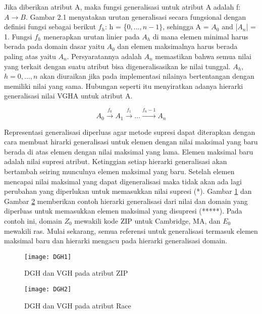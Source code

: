 \newpage
Jika diberikan atribut A, maka fungsi generalisasi untuk atribut A adalah f: $A \rightarrow B$. Gambar 2.1 menyatakan urutan generalisasi secara fungsional dengan definisi fungsi sebagai berikut $f_h$: h = \{$0,\ldots, n-1\}$, sehingga A = $A_0$ and |$A_n$| = 1. Fungsi $f_h$ menerapkan urutan linier pada $A_h$ di mana elemen minimal harus berada pada domain dasar yaitu $A_0$ dan elemen maksimalnya harus berada paling atas yaitu $A_n$. Persyaratannya adalah $A_n$ memastikan bahwa semua nilai yang terkait dengan suatu atribut bisa digeneralisasikan ke nilai tunggal. $A_h$, $h = 0, \ldots, n$ akan diuraikan jika pada implementasi nilainya bertentangan dengan memiliki nilai yang sama. Hubungan seperti itu menyiratkan adanya hierarki generalisasi nilai VGHA untuk atribut A. 

\[
  A_0 \overset{f_0} {\longrightarrow} A_1 \overset{f_1} {\longrightarrow} \mathcal{\ldots} \overset{f_n-1}{\longrightarrow} A_n
\]

Representasi generalisasi diperluas agar metode supresi dapat diterapkan dengan cara membuat hirarki generalisasi untuk elemen dengan nilai maksimal yang baru berada di atas elemen dengan nilai maksimal yang lama. Elemen maksimal baru adalah nilai supresi atribut. Ketinggian setiap hierarki generalisasi akan bertambah seiring munculnya elemen maksimal yang baru. Setelah elemen mencapai nilai maksimal yang dapat digeneralisasi maka tidak akan ada lagi perubahan yang diperlukan untuk memasukkan nilai supresi (*). Gambar \ref{fig:DGH1} dan Gambar \ref{fig:DGH2} memberikan contoh hierarki generalisasi dari nilai dan domain yang diperluas untuk memasukkan elemen maksimal yang disupresi (*****). Pada contoh ini, domain $Z_0$ mewakili kode ZIP untuk Cambridge, MA, dan $E_0$ mewakili ras. Mulai sekarang, semua referensi untuk generalisasi termasuk elemen maksimal baru dan hierarki mengacu pada hierarki generalisasi domain.

\begin{figure}[H]
	\centering
	\texttt{[image: DGH1]}
	\caption{DGH dan VGH pada atribut ZIP}
	\label{fig:DGH1}
\end{figure}

\begin{figure}[H]
	\centering
	\texttt{[image: DGH2]}
	\caption{DGH dan VGH pada atribut Race}
	\label{fig:DGH2}
\end{figure}




\newpage
